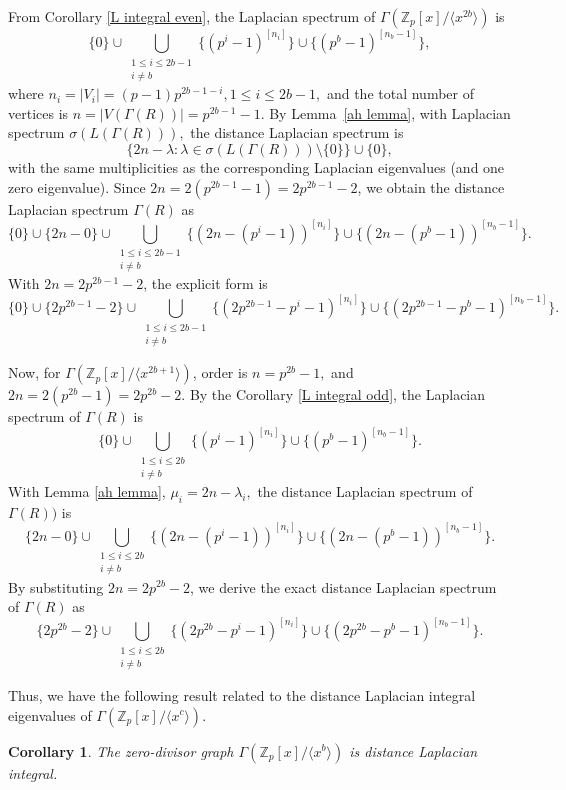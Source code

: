 \documentclass[12pt,twoside]{article}
\newtheorem{corollary}[theorem]{Corollary}
\begin{document}
	
From Corollary \ref{L integral even}, the Laplacian spectrum of $ \varGamma(\mathbb{Z}_p[x]/\langle x^{2b}\rangle)$ is
	\[\{0\}
	\cup
	\bigcup_{\substack{1\le i\le 2b-1\\ i\neq b}}
	\bigl\{(p^{ i}-1)^{[n_i]}\bigr\}
	\cup
	\bigl\{(p^{ b}-1)^{[n_b-1]}\bigr\},
	\]
	where $n_i = |V_i| = (p-1)p^{ 2b-1-i}, 1\le i\le 2b-1,$ and the total number of vertices is $n = |V( \varGamma(R))|= p^{2b-1}-1.$ By Lemma~\ref{ah lemma}, with Laplacian spectrum $\sigma(L( \varGamma(R))),$ the distance Laplacian spectrum is
	\[
	\{ 2n-\lambda : \lambda\in\sigma(L( \varGamma(R)))\setminus\{0\} \}
	\cup\{0\},
	\]
	with the same multiplicities as the corresponding Laplacian eigenvalues (and one zero eigenvalue). Since $2n = 2(p^{2b-1}-1)=2p^{2b-1}-2$, we obtain the distance Laplacian spectrum $ \varGamma(R)$ as	
	\[
	\{0\}
	\cup
	\{ 2n-0 \}
	\cup
	\bigcup_{\substack{1\le i\le 2b-1\\ i\neq b}}
	\bigl\{ (2n-(p^{ i}-1))^{[n_i]}\bigr\}
	\cup
	\bigl\{ (2n-(p^{ b}-1))^{[n_b-1]}\bigr\}.
	\]
	With $2n=2p^{2b-1}-2$,  the explicit form is
	\[
	\{0\}
	\cup
	\{ 2p^{2b-1}-2 \}
	\cup
	\bigcup_{\substack{1\le i\le 2b-1\\ i\neq b}}
	\bigl\{ (2p^{2b-1}-p^{ i}-1)^{[n_i]}\bigr\}
	\cup
	\bigl\{ (2p^{2b-1}-p^{ b}-1)^{[n_b-1]}\bigr\}.
	\]
	
	
	
	
	
	Now, for $ \varGamma(\mathbb{Z}_p[x]/\langle x^{2b+1}\rangle)$, order is $n=p^{2b}-1,$ and $2n = 2(p^{2b}-1) = 2p^{2b}-2.$ By the Corollary \ref{L integral odd}, the Laplacian spectrum  of $ \varGamma(R)$ is
	\[\{0\}\cup\bigcup_{\substack{1\le i\le 2b\\ i\neq b}}\{(p^{ i}-1)^{[n_i]}\}
	\cup\{(p^{ b}-1)^{[n_b-1]}\}.
	\]
	With Lemma \ref{ah lemma}, $	\mu_i = 2n - \lambda_i,$  the distance Laplacian spectrum of  $ \varGamma(R))$ is
	\[
	\{ 2n-0 \}
	\cup
	\bigcup_{\substack{1\le i\le 2b\\ i\neq b}}
	\bigl\{ (2n - (p^{ i}-1))^{[n_i]}\bigr\}
	\cup
	\bigl\{ (2n - (p^{ b}-1))^{[n_b-1]}\bigr\}.
	\]
	By substituting $2n = 2p^{2b}-2$, we derive the exact distance Laplacian spectrum of $ \varGamma(R)$ as
	\[ 	\{ 2p^{2b}-2 \} \cup \bigcup_{\substack{1\le i\le 2b\\ i\neq b}} 	\bigl\{ (2p^{2b}-p^{ i}-1)^{[n_i]}\bigr\} \cup 	\bigl\{ (2p^{2b}-p^{ b}-1)^{[n_b-1]}\bigr\}.
	\]
	
	Thus, we have the following result related to the distance Laplacian integral eigenvalues of $ \varGamma(\mathbb{Z}_p[x]/\langle x^{c}\rangle)$.
	\begin{corollary}\label{cor distance}
		The zero-divisor graph $ \varGamma(\mathbb{Z}_p[x]/\langle x^{b}\rangle)$ is distance Laplacian integral.
	\end{corollary}
	
\end{document}
